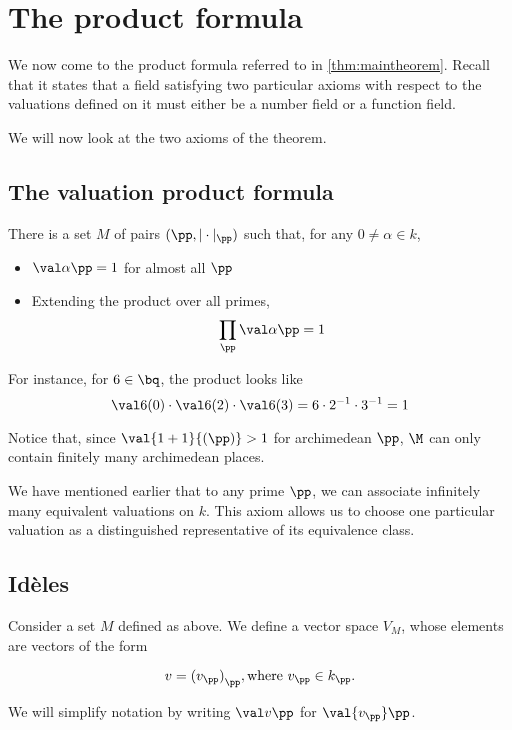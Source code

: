 \section{The product formula}
\label{sec:productformula}

We now come to the product formula referred to in \ref{thm:maintheorem}. Recall
that it states that a field satisfying two particular axioms with respect to the
valuations defined on it must either be a number field or a function field.

We will now look at the two axioms of the theorem.

\subsection{The valuation product formula}

\begin{axiom}
  \label{eq:axiom1}
  There is a set $M$ of pairs $(\pp, |\cdot|_\pp)$ such that, for any
  $0\neq \alpha \in k$,
  \begin{itemize}
  \item $\val\alpha\pp = 1$ for almost all $\pp$
  \item Extending the product over all primes,
    \[ \prod_\pp \val\alpha\pp = 1 \]
  \end{itemize}
  For instance, for $6\in\bq$, the product looks like
  \[ \val6{(0)} \cdot\val6{(2)}\cdot\val6{(3)} = 6\cdot 2^{-1} \cdot 3^{-1} =
    1 \]
\end{axiom}

Notice that, since $\val{1+1}{(\pp)} > 1$ for archimedean $\pp$, $\M$ can only
contain finitely many archimedean places.

We have mentioned earlier that to any prime $\pp$, we can associate infinitely
many equivalent valuations on $k$. This axiom allows us to choose one particular
valuation as a distinguished representative of its equivalence class.

\subsection{Id\`eles}
\label{sec:orgheadline19}
Consider a set $M$ defined as above. We define a vector space $V_M$, whose
elements are vectors of the form

\[ v={ (v_\pp) }_\pp, \text{where } v_\pp \in k_\pp. \]

We will simplify notation by writing $\val v\pp$ for $\val{v_\pp}\pp$.

